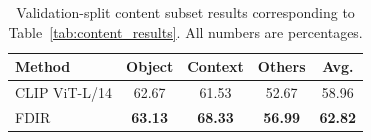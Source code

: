 \begin{table}[H]
\centering
\caption{Validation-split content subset results corresponding to Table~\ref{tab:content_results}. All numbers are percentages.}
\label{tab:content_results_val}
\begin{tabular}{lcccc}
\hline
Method & Object & Context & Others & Avg. \\
\hline
CLIP ViT-L/14 \cite{radford_learning_2021} & 62.67 & 61.53 & 52.67 & 58.96 \\
FDIR & \textbf{63.13} & \textbf{68.33} & \textbf{56.99} & \textbf{62.82} \\
\hline
\end{tabular}
\end{table}

